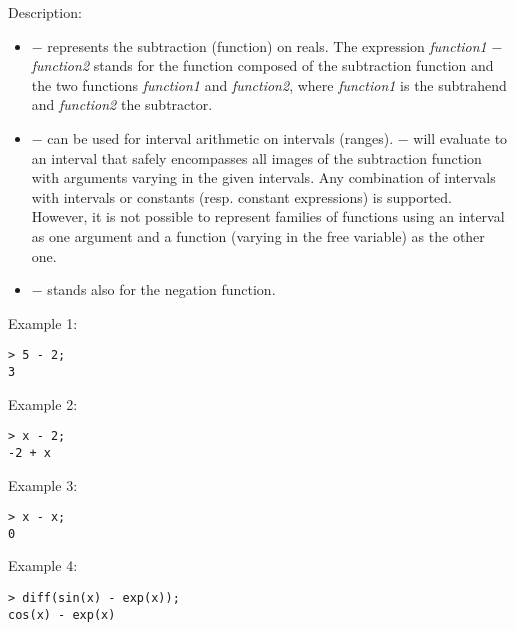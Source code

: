 \noindent Description: \begin{itemize}

\item \textbf{$-$} represents the subtraction (function) on reals. 
   The expression \emph{function1} \textbf{$-$} \emph{function2} stands for
   the function composed of the subtraction function and the two
   functions \emph{function1} and \emph{function2}, where \emph{function1} is 
   the subtrahend and \emph{function2} the subtractor.

\item \textbf{$-$} can be used for interval arithmetic on intervals
   (ranges). \textbf{$-$} will evaluate to an interval that safely
   encompasses all images of the subtraction function with arguments varying
   in the given intervals.  Any combination of intervals with intervals
   or constants (resp. constant expressions) is supported. However, it is
   not possible to represent families of functions using an interval as
   one argument and a function (varying in the free variable) as the
   other one.

\item \textbf{$-$} stands also for the negation function.
\end{itemize}
\noindent Example 1: 
\begin{center}\begin{minipage}{15cm}\begin{Verbatim}[frame=single]
> 5 - 2;
3
\end{Verbatim}
\end{minipage}\end{center}
\noindent Example 2: 
\begin{center}\begin{minipage}{15cm}\begin{Verbatim}[frame=single]
> x - 2;
-2 + x
\end{Verbatim}
\end{minipage}\end{center}
\noindent Example 3: 
\begin{center}\begin{minipage}{15cm}\begin{Verbatim}[frame=single]
> x - x;
0
\end{Verbatim}
\end{minipage}\end{center}
\noindent Example 4: 
\begin{center}\begin{minipage}{15cm}\begin{Verbatim}[frame=single]
> diff(sin(x) - exp(x));
cos(x) - exp(x)
\end{Verbatim}
\end{minipage}\end{center}
